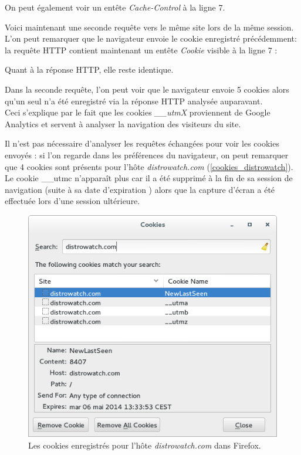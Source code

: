 On peut également voir un entête \textit{Cache-Control} à la ligne 7.
\newline

Voici maintenant une seconde requête vers le même site lors de la même session. L'on peut remarquer que le navigateur envoie le cookie enregistré précédemment: la requête HTTP contient maintenant un entête \textit{Cookie} visible à la ligne 7 :


Quant à la réponse HTTP, elle reste identique.
\newline

Dans la seconde requête, l'on peut voir que le navigateur envoie 5 cookies alors qu'un seul n'a été enregistré via la réponse HTTP analysée auparavant.\\
Ceci s'explique par le fait que les cookies \textit{\_\_utmX} proviennent de Google Analytics \cite{Google_Analytics_cookies} et servent à analyser la navigation des visiteurs du site.

Il n'est pas nécessaire d'analyser les requêtes échangées pour voir les cookies envoyés : si l'on regarde dans les préférences du navigateur, on peut remarquer que 4 cookies sont présents pour l'hôte \textit{distrowatch.com} (\autoref{cookies_distrowatch}). Le cookie \_\_utmc n'apparaît plus car il a été supprimé à la fin de sa session de navigation (suite à sa date d'expiration \cite{Google_Analytics_cookies}) alors que la capture d'écran a été effectuée lors d'une session ultérieure.

\begin{figure}[h]
	\centering
	\includegraphics[scale=0.75]{figures/cookies_distrowatch.png}
	\caption{\label{cookies_distrowatch}Les cookies enregistrés pour l'hôte \textit{distrowatch.com} dans Firefox.}
\end{figure}

